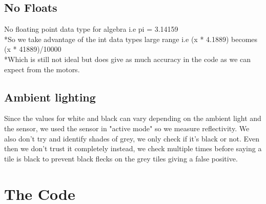 \documentclass[a4paper,11pt]{article}
\begin{document}
\subsection{No Floats}
No floating point data type for algebra i.e pi = 3.14159
\\*So we take advantage of the int data types large range
i.e (x * 4.1889) becomes (x * 41889)/10000
\\*Which is still not ideal but does give as much accuracy in the code as we can expect from the motors.

\subsection{Ambient lighting}
Since the values for white and black can vary depending on the ambient light and the sensor, we used the sensor in "active mode" so we measure reflectivity. We also don't try and identify shades of grey, we only check if it's black or not. Even then we don't trust it completely instead, we check multiple times before saying a tile is black to prevent black flecks on the grey tiles giving a false positive.

\clearpage
\section {The Code}
\end{document}
